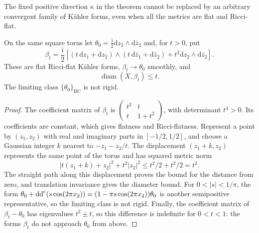 The fixed positive direction $\kappa$ in the theorem cannot be replaced by an arbitrary convergent family of K\"ahler forms, even when all the metrics are flat and Ricci-flat.

\begin{example}\label{ex:unrestricted-torus-collapse}
On the same square torus let $\theta_0=\frac{\mathrm i}{2}\mathrm dz_2\wedge\mathrm d\bar z_2$ and, for $t>0$, put
\[
 \beta_t=\frac{\mathrm i}{2}\left[
    (t\,\mathrm dz_1+\mathrm dz_2)
      \wedge(t\,\mathrm d\bar z_1+\mathrm d\bar z_2)
       +t^2\mathrm dz_2\wedge\mathrm d\bar z_2\right].
\]
These are flat Ricci-flat K\"ahler forms, $\beta_t\to\theta_0$ smoothly, and
\[
 \operatorname{diam}(X,\beta_t)\leq t.
\]
The limiting class $\{\theta_0\}_{\mathrm{BC}}$ is not rigid.
\end{example}
\begin{proof}
The coefficient matrix of $\beta_t$ is $\left(\begin{smallmatrix}t^2&t\\t&1+t^2\end{smallmatrix}\right)$, with determinant $t^4>0$. Its coefficients are constant, which gives flatness and Ricci-flatness. Represent a point by $(z_1,z_2)$ with real and imaginary parts in $[-1/2,1/2]$, and choose a Gaussian integer $k$ nearest to $-z_1-z_2/t$. The displacement $(z_1+k,z_2)$ represents the same point of the torus and has squared metric norm
\[
 |t(z_1+k)+z_2|^2+t^2|z_2|^2
       \leq t^2/2+t^2/2=t^2.
\]
The straight path along this displacement proves the bound for the distance from zero, and translation invariance gives the diameter bound. For $0<|s|<1/\pi$, the form $\theta_0+\mathrm{dd}^{\mathrm{c}}(s\cos(2\pi x_2))=(1-\pi s\cos(2\pi x_2))\theta_0$ is another semipositive representative, so the limiting class is not rigid. Finally, the coefficient matrix of $\beta_t-\theta_0$ has eigenvalues $t^2\pm t$, so this difference is indefinite for $0<t<1$: the forms $\beta_t$ do not approach $\theta_0$ from above.
\end{proof}
